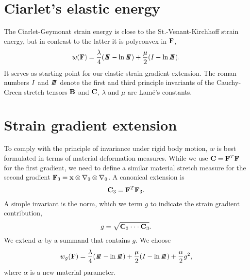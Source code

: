\documentclass[a4paper]{article}
\begin{document}
\section{Ciarlet's elastic energy}
The Ciarlet-Geymonat strain energy is close to the St.-Venant-Kirchhoff strain energy, but in contrast to the latter it is polyconvex in ${\mathbf{ F}}$, 
\begin{align}
w(\fF)=\frac{\lambda}{4}(\III-\ln\III)+\frac{\mu}{2}(\I-\ln\III).
\end{align}
It serves as starting point for our elastic strain gradient extension.
The roman numbers $I$ and $I\!\!I\!\!I$ denote the first and third principle 
invariants of the Cauchy-Green stretch tensors ${\mathbf{ B}}$ and ${\mathbf{ C}}$, 
$\lambda$ and $\mu$ are Lam\'e's constants. 
\section{Strain gradient extension}
To comply with the principle of invariance under rigid body motion, $w$ 
is best formulated in terms of material deformation measures. While we use 
${\mathbf{ C}}={\mathbf{ F}}^T{\mathbf{ F}}$ for the first gradient, we need to define a similar 
material stretch measure for the second gradient 
${\mathbf{ F}}_3={\mathbf{ x}}\otimes\nabla_0\otimes\nabla_0$. A canonical extension is
\begin{align}
{\mathbf{ C}}_3={\mathbf{ F}}^T{\mathbf{ F}}_3.
\end{align}
A simple invariant is the norm, which we term $g$ to 
indicate the strain gradient contribution,
\begin{align}
g=\sqrt{{\mathbf{ C}}_3\cdot\cdot\cdot{\mathbf{ C}}_3}.
\end{align}
We extend $w$ by a summand that contains $g$. We choose
\begin{align}
w_g(\fF)=\frac{\lambda}{4}(\III-\ln\III)+\frac{\mu}{2}(\I-\ln\III)+\frac{\alpha}{2}g^2,
\end{align}
where $\alpha$ is a new material parameter. 
\end{document}
